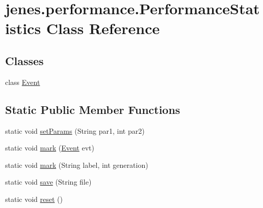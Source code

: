 \hypertarget{classjenes_1_1performance_1_1_performance_statistics}{\section{jenes.\-performance.\-Performance\-Statistics Class Reference}
\label{classjenes_1_1performance_1_1_performance_statistics}
}
\subsection*{Classes}
\begin{DoxyCompactItemize}
\item 
class \hyperlink{classjenes_1_1performance_1_1_performance_statistics_1_1_event}{Event}
\end{DoxyCompactItemize}
\subsection*{Static Public Member Functions}
\begin{DoxyCompactItemize}
\item 
static void \hyperlink{classjenes_1_1performance_1_1_performance_statistics_a6a2f77191a06922c9bbc3be567c94be4}{set\-Params} (String par1, int par2)
\item 
static void \hyperlink{classjenes_1_1performance_1_1_performance_statistics_a34a1034b034368f40314908f451a8cc6}{mark} (\hyperlink{classjenes_1_1performance_1_1_performance_statistics_1_1_event}{Event} evt)
\item 
static void \hyperlink{classjenes_1_1performance_1_1_performance_statistics_a3f39608489ba96dca0b07f6f26eae268}{mark} (String label, int generation)
\item 
static void \hyperlink{classjenes_1_1performance_1_1_performance_statistics_a96952887207f02e11b543c4f93f48a18}{save} (String file)
\item 
static void \hyperlink{classjenes_1_1performance_1_1_performance_statistics_aeb062f4bb2d714e70245c67798ddc3e3}{reset} ()
\end{DoxyCompactItemize}
